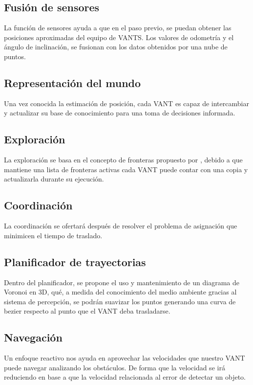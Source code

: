 \subsection*{Fusión de sensores}
La función de sensores ayuda a que en el paso previo, se puedan obtener las posiciones aproximadas del equipo de VANTS. Los valores de odometría y el ángulo de inclinación, se fusionan con los datos obtenidos por una nube de puntos.

\subsection*{Representación del mundo}
Una vez conocida la estimación de posición, cada VANT es capaz de intercambiar y actualizar su base de conocimiento para una toma de decisiones informada.

\subsection*{Exploración}
La exploración se basa en el concepto de fronteras propuesto por \citeauthor{YAMAUCHI1997}, debido a que mantiene una lista de fronteras activas cada VANT puede contar con una copia y actualizarla durante su ejecución.

\subsection*{Coordinación}
La coordinación se ofertará después de resolver el problema de asignación que minimicen el tiempo de traslado.

\subsection*{Planificador de trayectorias}
Dentro del planificador, se propone el uso y mantenimiento de un diagrama de Voronoi en 3D, qué, a medida del conocimiento del medio ambiente gracias al sistema de percepción, se podrán suavizar los puntos generando una curva de bezier respecto al punto que el VANT deba trasladarse.

\subsection*{Navegación}
Un enfoque reactivo nos ayuda en aprovechar las velocidades que nuestro VANT puede navegar analizando los obstáculos. De forma que la velocidad se irá reduciendo en base a que la velocidad relacionada al error de detectar un objeto.

